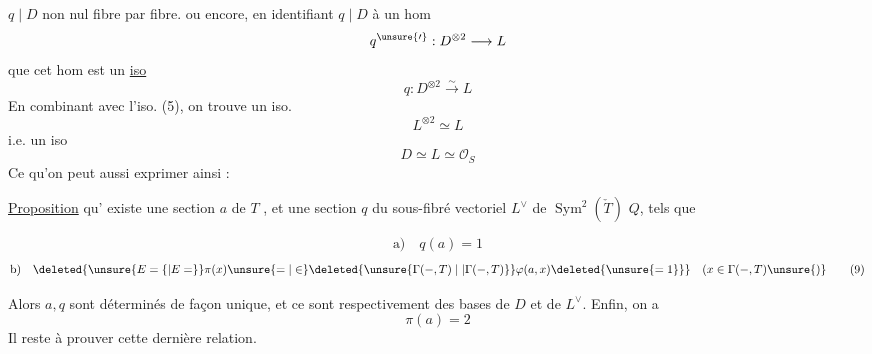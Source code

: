$q\mid D$ non nul fibre par fibre.
ou encore, en identifiant $q\mid D$ à un hom
\[
q^{\unsure{\prime}}:D^{\otimes2}\longrightarrow L
\]
que cet hom est un \uline{iso}
\[
q:D^{\otimes2}\xrightarrow{\sim}L\tag*{(6)}
\]
 En combinant avec l'iso. (5), on trouve un iso.
\[
L^{\otimes2}\simeq L
\]
i.e. un iso
\[
D\simeq L\simeq\mathcal O_S\tag*{(7)}
\]
Ce qu'on peut aussi exprimer ainsi :

\uline{Proposition}  qu' existe une  section $a$ de $T$ , et une section $q$ du sous-fibré vectoriel $L^\vee$ de $\operatorname{Sym}^2(\check T)$  $Q$, tels que

\[
\text{a)}\quad q(a)=1\tag*{(8)}
\]
\[
\text{b)}\quad\deleted{\unsure{E=\{|E=}}\pi(x)\unsure{=|\in}\deleted{\unsure{\Gamma(-,T)\mid|\Gamma(-,T)}}\varphi(a,x)\deleted{\unsure{=1\}}}\quad(x\in\Gamma(-,T)\unsure{)}
\tag*{(9)}
\]

Alors $a,q$ sont déterminés de façon unique, et ce sont respectivement des bases de $D$ et de $L^\vee$. Enfin, on a
\[
\pi(a)=2\tag*{(10)}
\]
Il reste à prouver cette dernière relation. 
